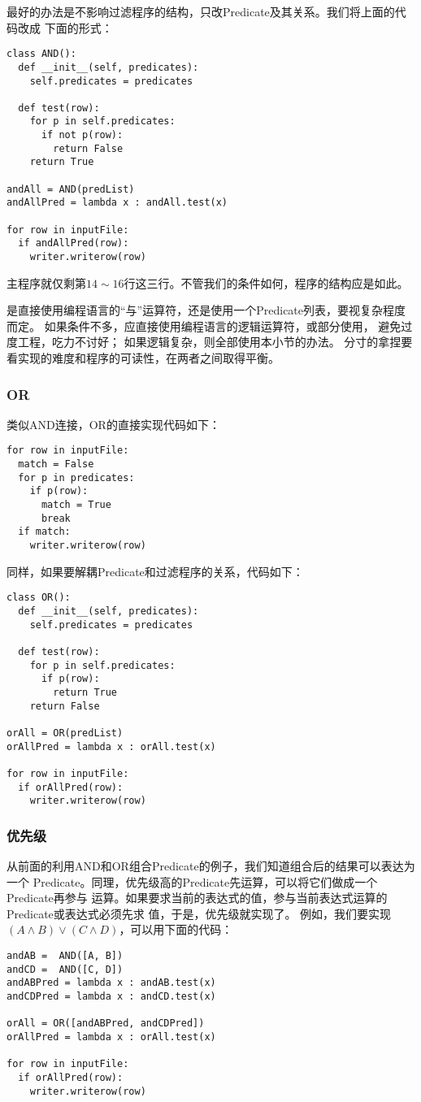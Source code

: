 \documentclass[11pt]{article}
\begin{document}
最好的办法是不影响过滤程序的结构，只改Predicate及其关系。我们将上面的代码改成
下面的形式：
\begin{lstlisting}
class AND():
  def __init__(self, predicates):
    self.predicates = predicates

  def test(row):
    for p in self.predicates:
      if not p(row):
        return False
    return True

andAll = AND(predList)
andAllPred = lambda x : andAll.test(x)

for row in inputFile:
  if andAllPred(row):
    writer.writerow(row)
\end{lstlisting}
主程序就仅剩第$14 \sim 16$行这三行。不管我们的条件如何，程序的结构应是如此。

是直接使用编程语言的“与”运算符，还是使用一个Predicate列表，要视复杂程度而定。
如果条件不多，应直接使用编程语言的逻辑运算符，或部分使用，
避免过度工程，吃力不讨好；
如果逻辑复杂，则全部使用本小节的办法。
分寸的拿捏要看实现的难度和程序的可读性，在两者之间取得平衡。

\subsubsection{OR}

类似AND连接，OR的直接实现代码如下：
\begin{lstlisting}
for row in inputFile:
  match = False
  for p in predicates:
    if p(row):
      match = True
      break
  if match:
    writer.writerow(row)
\end{lstlisting}

同样，如果要解耦Predicate和过滤程序的关系，代码如下：
\begin{lstlisting}
class OR():
  def __init__(self, predicates):
    self.predicates = predicates

  def test(row):
    for p in self.predicates:
      if p(row):
        return True
    return False

orAll = OR(predList)
orAllPred = lambda x : orAll.test(x)

for row in inputFile:
  if orAllPred(row):
    writer.writerow(row)
\end{lstlisting}

\subsubsection{优先级}
从前面的利用AND和OR组合Predicate的例子，我们知道组合后的结果可以表达为一个
Predicate。同理，优先级高的Predicate先运算，可以将它们做成一个Predicate再参与
运算。如果要求当前的表达式的值，参与当前表达式运算的Predicate或表达式必须先求
值，于是，优先级就实现了。
例如，我们要实现$(A \land B) \lor (C \land D) $，可以用下面的代码：
\begin{lstlisting}
andAB =  AND([A, B])
andCD =  AND([C, D])
andABPred = lambda x : andAB.test(x)
andCDPred = lambda x : andCD.test(x)

orAll = OR([andABPred, andCDPred])
orAllPred = lambda x : orAll.test(x)

for row in inputFile:
  if orAllPred(row):
    writer.writerow(row)
\end{lstlisting}
\end{document}
